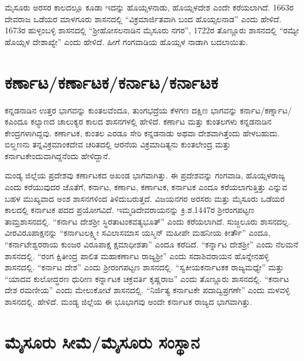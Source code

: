 ಮೈಸೂರು ಅರಸರ ಕಾಲದಲ್ಲೂ ಕೂಡಾ ಇದನ್ನು ಹೊಯ್ಸಳನಾಡು, ಹೊಯ್ಸಳದೇಶ ಎಂದೇ ಕರೆಯಲಾಗಿದೆ. 1663ರ ದೇವರಾಜ ಒಡೆಯರ ಮಾಳಗೂರು ಶಾಸನದಲ್ಲಿ “ವಿಕ್ರಮಾರ್ಜಿತವಾಗಿ ಬಂದ ಹೊಯ್ಸಲನಾಡ” ಎಂದು ಹೇಳಿದೆ. 1673ರ ಹುಳ್ಳಂಬಳ್ಳಿ ಶಾಸನದಲ್ಲಿ “ಶ‍್ರೀಹೋಸಲನಾಡಿನ ಮೈಸೂರು ನಗರ”, 1722ರ ತೊಣ್ಣೂರು ಶಾಸನದಲ್ಲಿ “ರಮ್ಯೇ ಹೊಯ್ಸಳ ದೇಶಾಖ್ಯೇ” ಎಂದು ಹೇಳಿದೆ. ಹೀಗೆ ಗಂಗವಾಡಿಯ ಹೊಯ್ಸಳ ನಾಡಾಗಿ ಬದಲಾಯಿತು.


\section{ಕರ್ಣಾಟ/ಕರ್ಣಾಟಕ/ಕರ್ನಾಟ/ಕರ್ನಾಟಕ}

ಕನ್ನಡನಾಡಿನ ಉತ್ತರ ಭಾಗವನ್ನು ಕುಂತಲವೆಂದೂ, ತುಂಗಭದ್ರೆಯ ಕೆಳಗಣ ದಕ್ಷಿಣ ಭಾಗವನ್ನು ಕರ್ನಾಟ/ಕರ್ಣ್ನಾಟ/ಕ\break ಎಂದೂ ಕಲ್ಯಾಣದ ಚಾಲುಕ್ಯರ ಕಾಲದ ಶಾಸನಗಳಲ್ಲಿ ಹೇಳಿದೆ. ಕರ್ಣಾಟ ಮತ್ತು ಕುಂತಲಗಳು ಕನ್ನಡನಾಡಿನ ಕೇಂದ್ರಗಳಾ\-ಗಿದ್ದವು. ಕರ್ಣಾಟಕ, ಕುಂತಲ ಎರಡೂ ಸೇರಿ ಕನ್ನಡನಾಡು ಅಥವಾ ದೇಶವಾಗಿತ್ತೆಂದು ಹೇಳಬಹುದು. ಬಿಲ್ಹಣನು ತನ್ನ\break ವಿಕ್ರಮಾಂಕದೇವ ಚರಿತದಲ್ಲಿ ಆರನೆಯ ವಿಕ್ರಮಾದಿತ್ಯನು ಕುಂತಲೇಂದ್ರ ಮತ್ತು ಕರ್ನಾಟಕೇಂದುವಾಗಿದ್ದನೆಂದು ಹೇಳಿದ್ದಾನೆ.

ಮಂಡ್ಯ ಜಿಲ್ಲೆಯ ಪ್ರದೇಶವು ಕರ್ಣಾಟಕದ ಅಖಂಡ ಭಾಗವಾಗಿತ್ತು. ಈ ಪ್ರದೇಶವನ್ನು ಗಂಗವಾಡಿ, ಹೊಯ್ಸಳರಾಜ್ಯ ಎಂದು ಕರೆಯುವುದರ ಜೊತೆಗೆ, ಕರ್ನಾಟ, ಕರ್ಣಾಟ, ಕರ್ಣಾಟಕ, ಕರ್ನಾಟಕ ಎಂದೂ ಕರೆಯಲಾಗುತ್ತಿತ್ತು ಎನ್ನುವ ಬಹಳ ಮುಖ್ಯವಾದ ಅಂಶ ಶಾಸನಗಳಿಂದ ತಿಳಿದುಬರುತ್ತದೆ. ವಿಜಯನಗರ ಅರಸರು ಮತ್ತು ಮೈಸೂರು ಒಡೆಯರ ಕಾಲದಲ್ಲಿ ಕರ್ನಾಟಕ ಪದದ ಪ್ರಯೋಗವಿದೆ. ಇಮ್ಮಡಿದೇವರಾಯನನ್ನು ಕ್ರಿ.ಶ.1447ರ ಶ‍್ರೀರಂಗಪಟ್ಟಣ ತಾಮ್ರಶಾಸನದಲ್ಲಿ. “ಕರ್ನಾಟ ದೇಶಶ‍್ರೀ ಸ್ಥಿರತಾಟಂಕವತ್ಯಭೂತ್​” ಎಂದು ಕರೆಯಲಾಗಿದೆ. ಸುಜ್ಜಲೂರು ಶಾಸನದಲ್ಲ. ವೀರವಿರೂಪಾಕ್ಷನನ್ನು “ಕರ್ನಾಟಲಕ್ಷ್ಮೀ ಸವಿಲಾಸಮಾಸ ಯಸ್ಮಿನ್​ ಮಹೀಪೇ ಮಹನೀಯ ಕೀರ್ತೌ” ಎಂದೂ, “ಕರ್ನಾಟೇಶ್ವರರಾಯ ಕುಂಜರ ವಿರೂಪಾಕ್ಷ ಕ್ಷಮಾಧೀಶತಾ” ಎಂದೂ ಕರೆದಿದೆ. “ಕರ್ನ್ನಾಟ ದೇಶಶ‍್ರೀ” ಎಂದು ನೆಲಮನೆ ಶಾಸನದಲ್ಲಿ. “ರಂಗ ಕ್ಷಿತೀಂದ್ರ ಪಾಲಿತ ಮಹಾಕರ್ಣಾಟ ರಾಜ್ಯಶ‍್ರೀ” ಎಂದು ಸದಾಶಿವರಾಯನ ಹೊನ್ನೇನಹಳ್ಳಿ ಶಾಸನದಲ್ಲಿ. “ಕರ್ನಾಟ ದೇಶ” ಎಂದು ಶ‍್ರೀರಂಗಪಟ್ಟಣ ಶಾಸನದಲ್ಲಿ. “ಸ್ವಕೀಯಕರ್ನಾಟಕಕ ರಾಜ್ಯಮಧ್ಯೇ” ಮತ್ತು “ಯಾದವ ಕುಲೋದ್ಧರಣ ಧುರೀಣ ಕರ್ನ್ನಾಟಕ ಚಕ್ರವರ್ತಿ ಕೃಷ್ಣರಾಜ” ಎಂದು ತೊಣ್ಣೂರು ಶಾಸನದಲ್ಲಿ. “ಕರ್ನಾಟ ದೇಶ ರಮಣೀಯ” ಎಂದು ಮೇಲುಕೋಟೆ ಶಾಸನದಲ್ಲಿ. “ನಿರ್ಜಿತ್ಯ ಕರ್ನಾಟಕೇ ಪದಾದ್ವಿಪ್ರಗಣೇ” ಎಂದು ಮಳವಳ್ಳಿ ಶಾಸನದಲ್ಲಿ. ಹೇಳಿದೆ. ಮಂಡ್ಯ ಜಿಲ್ಲೆಯ ಈ ಭೂಭಾಗವು ಅಂದೇ ಕರ್ನಾಟಕ ರಾಜ್ಯದ ಭಾಗವಾಗಿತ್ತು.


\section{ಮೈಸೂರು ಸೀಮೆ/ಮೈಸೂರು ಸಂಸ್ಥಾನ}

